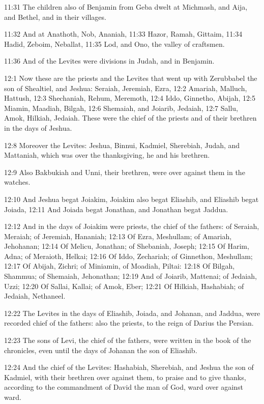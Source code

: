 11:31 The children also of Benjamin from Geba dwelt at Michmash, and
Aija, and Bethel, and in their villages.

11:32 And at Anathoth, Nob, Ananiah, 11:33 Hazor, Ramah, Gittaim,
11:34 Hadid, Zeboim, Neballat, 11:35 Lod, and Ono, the valley of
craftsmen.

11:36 And of the Levites were divisions in Judah, and in Benjamin.

12:1 Now these are the priests and the Levites that went up with
Zerubbabel the son of Shealtiel, and Jeshua: Seraiah, Jeremiah, Ezra,
12:2 Amariah, Malluch, Hattush, 12:3 Shechaniah, Rehum, Meremoth, 12:4
Iddo, Ginnetho, Abijah, 12:5 Miamin, Maadiah, Bilgah, 12:6 Shemaiah,
and Joiarib, Jedaiah, 12:7 Sallu, Amok, Hilkiah, Jedaiah. These were
the chief of the priests and of their brethren in the days of Jeshua.

12:8 Moreover the Levites: Jeshua, Binnui, Kadmiel, Sherebiah, Judah,
and Mattaniah, which was over the thanksgiving, he and his brethren.

12:9 Also Bakbukiah and Unni, their brethren, were over against them
in the watches.

12:10 And Jeshua begat Joiakim, Joiakim also begat Eliashib, and
Eliashib begat Joiada, 12:11 And Joiada begat Jonathan, and Jonathan
begat Jaddua.

12:12 And in the days of Joiakim were priests, the chief of the
fathers: of Seraiah, Meraiah; of Jeremiah, Hananiah; 12:13 Of Ezra,
Meshullam; of Amariah, Jehohanan; 12:14 Of Melicu, Jonathan; of
Shebaniah, Joseph; 12:15 Of Harim, Adna; of Meraioth, Helkai; 12:16 Of
Iddo, Zechariah; of Ginnethon, Meshullam; 12:17 Of Abijah, Zichri; of
Miniamin, of Moadiah, Piltai: 12:18 Of Bilgah, Shammua; of Shemaiah,
Jehonathan; 12:19 And of Joiarib, Mattenai; of Jedaiah, Uzzi; 12:20 Of
Sallai, Kallai; of Amok, Eber; 12:21 Of Hilkiah, Hashabiah; of
Jedaiah, Nethaneel.

12:22 The Levites in the days of Eliashib, Joiada, and Johanan, and
Jaddua, were recorded chief of the fathers: also the priests, to the
reign of Darius the Persian.

12:23 The sons of Levi, the chief of the fathers, were written in the
book of the chronicles, even until the days of Johanan the son of
Eliashib.

12:24 And the chief of the Levites: Hashabiah, Sherebiah, and Jeshua
the son of Kadmiel, with their brethren over against them, to praise
and to give thanks, according to the commandment of David the man of
God, ward over against ward.

